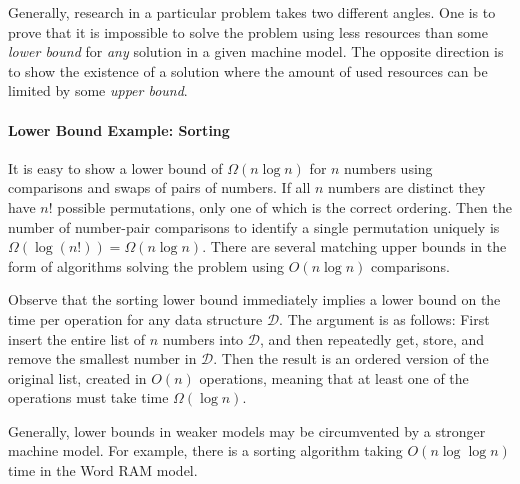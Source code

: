 Generally, research in a particular problem takes two different angles. 
One is to prove that it is impossible to solve the problem using less resources than some \emph{lower bound} for \emph{any} solution in a given machine model. The opposite direction is to show the existence of a solution where the amount of used resources can be limited by some \emph{upper bound}. 

\begin{leftbar}
    \vspace{-1.4em} \paragraph{Lower Bound Example: Sorting}
    It is easy to show a lower bound of $\Omega(n \log n)$ for  $n$ numbers using comparisons and swaps of pairs of numbers. If all $n$ numbers are distinct they have $n!$ possible permutations, only one of which is the correct ordering. Then the number of number-pair comparisons to identify a single permutation uniquely is $\Omega(\log (n!)) = \Omega(n \log n)$. There are several matching upper bounds in the form of algorithms solving the problem using $O(n \log n)$ comparisons.

    Observe that the sorting lower bound immediately implies a lower bound on the time per operation for any  data structure $\mathcal{D}$. The argument is as follows: First insert the entire list of $n$ numbers into $\mathcal{D}$, and then repeatedly get, store, and remove the smallest number in $\mathcal{D}$. Then the result is an ordered version of the original list, created in $O(n)$ operations, meaning that at least one of the operations must take time $\Omega(\log n)$.

    Generally, lower bounds in weaker models may be circumvented by a stronger machine model. For example, there is a sorting algorithm taking $O(n \log \log n)$ time in the Word RAM model.
\end{leftbar}


